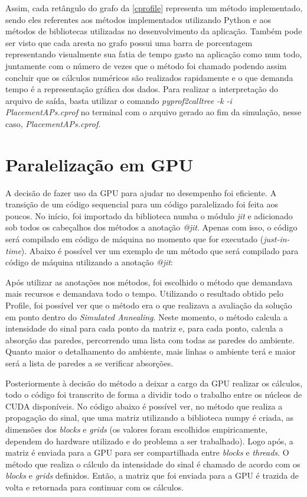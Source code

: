 \documentclass[
	12pt,				%
	twoside,			%
	a4paper,			%
	english,			%
	french,				%
	spanish,			%
	brazil				%
	]{abntex2}
\begin{document}
Assim, cada retângulo do grafo da \autoref{cprofile} representa um
método implementado, sendo eles referentes aos métodos implementados
utilizando Python e aos métodos de bibliotecas utilizadas no
desenvolvimento da aplicação. Também pode ser visto que cada aresta no
grafo possui uma barra de porcentagem representando visualmente sua
fatia de tempo gasto na aplicação como num todo, juntamente com o número
de vezes que o método foi chamado podendo assim concluir que os cálculos
numéricos são realizados rapidamente e o que demanda tempo é a
representação gráfica dos dados. Para realizar a interpretação do
arquivo de saída, basta utilizar o comando \emph{pyprof2calltree -k -i
PlacementAPs.cprof} no terminal com o arquivo gerado ao fim da
simulação, nesse caso, \emph{PlacementAPs.cprof}.

\section{Paralelização em GPU}\label{paralelizauxe7uxe3o-em-gpu}

A decisão de fazer uso da GPU para ajudar no desempenho foi eficiente. A
transição de um código sequencial para um código paralelizado foi feita
aos poucos. No início, foi importado da biblioteca numba o módulo
\emph{jit} e adicionado sob todos os cabeçalhos dos métodos a anotação
\emph{@jit}. Apenas com isso, o código será compilado em código de
máquina no momento que for executado (\emph{just-in-time}). Abaixo é
possível ver um exemplo de um método que será compilado para código de
máquina utilizando a anotação \emph{@jit}:



Após utilizar as anotações nos métodos, foi escolhido o método que
demandava mais recursos e demandava todo o tempo. Utilizando o resultado
obtido pelo Profile, foi possível ver que o método era o que realizava a
avaliação da solução em ponto dentro do \emph{Simulated Annealing}.
Neste momento, o método calcula a intensidade do sinal para cada ponto
da matriz e, para cada ponto, calcula a absorção das paredes,
percorrendo uma lista com todas as paredes do ambiente. Quanto maior o
detalhamento do ambiente, mais linhas o ambiente terá e maior será a
lista de paredes a se verificar absorções.

Posteriormente à decisão do método a deixar a cargo da GPU realizar os
cálculos, todo o código foi transcrito de forma a dividir todo o
trabalho entre os núcleos de CUDA disponíveis. No código abaixo é
possível ver, no método que realiza a propagação do sinal, que uma
matriz utilizando a biblioteca numpy é criada, as dimensões dos
\emph{blocks} e \emph{grids} (os valores foram escolhidos empiricamente,
dependem do hardware utilizado e do problema a ser trabalhado). Logo
após, a matriz é enviada para a GPU para ser compartilhada entre
\emph{blocks} e \emph{threads}. O método que realiza o cálculo da
intensidade do sinal é chamado de acordo com os \emph{blocks} e
\emph{grids} definidos. Então, a matriz que foi enviada para a GPU é
trazida de volta e retornada para continuar com os cálculos.
\end{document}
